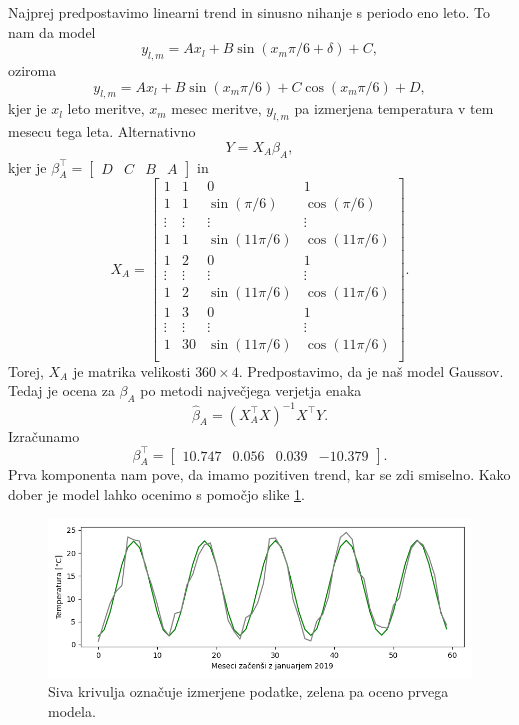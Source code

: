 \documentclass[12pt, a4paper]{article}
\begin{document}
Najprej predpostavimo linearni trend in sinusno nihanje s periodo eno leto. 
To nam da model
\[
    y_{l,m} = Ax_l + B\sin(x_m\pi/6 + \delta) + C,
\]
oziroma
\[
    y_{l,m} = Ax_l + B\sin(x_m\pi/6) + C\cos(x_m\pi/6) + D,
\]
kjer je $x_l$ leto meritve, $x_m$ mesec meritve, $y_{l,m}$ pa 
izmerjena temperatura v tem mesecu tega leta. Alternativno
\[
    Y = X_A\beta_A,
\]
kjer je $\beta_A^\top = \begin{bmatrix}
    D & C & B & A
\end{bmatrix}$ in
\[
    X_A = \begin{bmatrix}
        1 & 1 & 0 & 1 \\
        1 & 1 & \sin\left(\pi/6\right) & \cos\left(\pi/6\right) \\
        \vdots & \vdots & \vdots & \vdots \\
        1 & 1 &  \sin\left(11\pi/6\right) & \cos\left(11\pi/6\right) \\
        1 & 2 & 0 & 1 \\
        \vdots & \vdots & \vdots & \vdots \\
        1 & 2 &  \sin\left(11\pi/6\right) & \cos\left(11\pi/6\right) \\
        1 & 3 &  0 & 1 \\
        \vdots & \vdots & \vdots & \vdots \\
        1 & 30 & \sin\left(11\pi/6\right) & \cos\left(11\pi/6\right)\\
        \end{bmatrix}.
\]
Torej, $X_A$ je matrika velikosti $360 \times 4$. Predpostavimo, da je 
naš model Gaussov. Tedaj je ocena za $\beta_A$ po metodi največjega 
verjetja enaka
\[
    \hat \beta_A = (X_A^\top X)^{-1} X^\top Y.
\]
Izračunamo
\[
    \beta_A^\top = \begin{bmatrix}
        10.747 & 0.056 & 0.039 & -10.379
    \end{bmatrix}.
\]
Prva komponenta nam pove, da imamo pozitiven trend, kar se zdi 
smiselno. Kako dober je model lahko ocenimo s pomočjo slike 
\ref{png:prvi}.
\begin{figure}[H]
    \centering
    \includegraphics[width=14cm]{Slike/prvi_model.png}
    \caption{Siva krivulja označuje izmerjene podatke, zelena pa oceno 
    prvega modela.}
    \label{png:prvi}
\end{figure}
\end{document}
